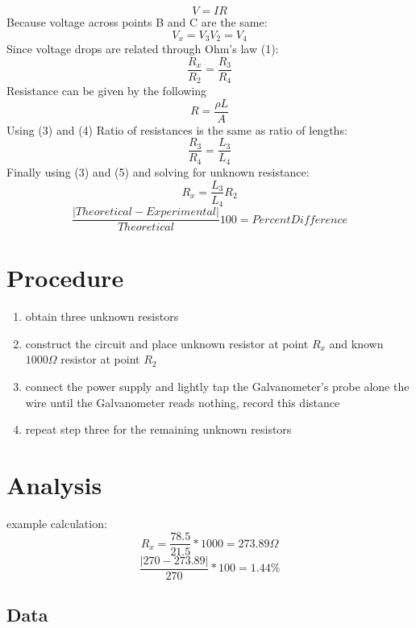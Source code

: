 \documentclass[11pt,letterpaper]{article}
\begin{document}
\begin{equation}
V=IR
\end{equation}
Because voltage across points B and C are the same:
\begin{equation}
V_x = V_3
V_2 = V_4
\end{equation}
Since voltage drops are related through Ohm's law (1):
\begin{equation}
\frac{R_x}{R_2} = \frac{R_3}{R_4}
\end{equation}
Resistance can be given by the following
\begin{equation}
R = \frac{\rho L}{A}
\end{equation}
Using (3) and (4) Ratio of resistances is the same as ratio of lengths:
\begin{equation}
\frac{R_3}{R_4} = \frac{L_3}{L_4}
\end{equation}
Finally using (3) and (5) and solving for unknown resistance:
\begin{equation}
R_x = \frac{L_3}{L_4}R_2
\end{equation}
\begin{equation}
\frac{|Theoretical - Experimental|}{Theoretical}100 = Percent Difference
\end{equation}

\section*{Procedure}
\begin{enumerate}
\item obtain three unknown resistors
\item construct the circuit and place unknown resistor at point \(R_x\) and known \(1000\Omega\) resistor at point \(R_2\)
\item connect the power supply and lightly tap the Galvanometer's probe alone the wire until the Galvanometer reads nothing, record this distance
\item repeat step three for the remaining unknown resistors
\end{enumerate}
\section*{Analysis}
example calculation:
\[R_x = \frac{78.5}{21.5}*1000 = 273.89\Omega\]
\[\frac{|270 - 273.89|}{270}*100 = 1.44\%\]
\subsection*{Data}
\begin{table}[H]
\end{table}
\end{document}
